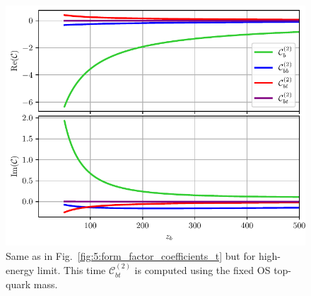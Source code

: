\begin{figure}[ht]
\centering
\includegraphics[width=\figurewidth]{Images/form_factor_coefficients_b.pdf}
\caption{Same as in Fig.~\ref{fig:5:form_factor_coefficients_t} but for high-energy limit. This time $\mathcal{C}_{bt}^{(2)}$ is computed using the fixed \acs{OS} top-quark mass.}
\label{fig:5:form_factor_coefficients_b}
\end{figure}
